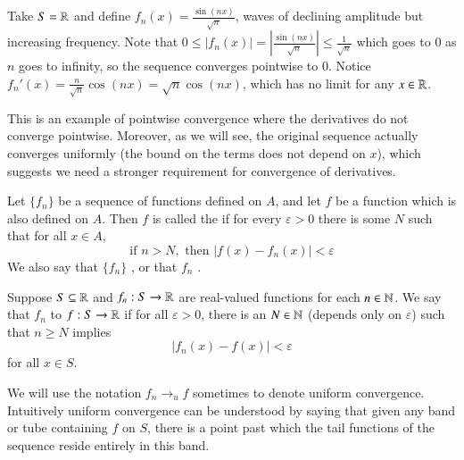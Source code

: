 \begin{example}
    Take $S = \mathbb R$ and define $f_n(x) = \frac{\sin(nx)}{\sqrt{n}}$, waves of declining amplitude but increasing frequency. Note that $0 \leq |f_n(x)| = \left|\frac{\sin(nx)}{\sqrt{n}}\right| \leq \frac{1}{\sqrt{n}}$ which goes to $0$ as $n$ goes to infinity, so the sequence converges pointwise to $0$. Notice $f_n'(x) = \frac{n}{\sqrt{n}}\cos(nx) = \sqrt{n}\cos(nx)$, which has no limit for any $x \in \mathbb R$.
\end{example}

This is an example of pointwise convergence where the derivatives do not converge pointwise. Moreover, as we will see, the original sequence actually converges uniformly (the bound on the terms does not depend on $x$), which suggests we need a stronger requirement for convergence of derivatives.


\begin{definition}
    Let $\{f_n\}$ be a sequence of functions defined on $A$, and let $f$ be a function which is also defined on $A$. Then $f$ is called the  if for every $\varepsilon > 0$ there is some $N$ such that for all $x \in A$, \begin{equation*}
        \text{if } n> N, \text{ then } |f(x) - f_n(x)| < \varepsilon
    \end{equation*}
    We also say that $\{f_n\}$ , or that $f_n$ .
\end{definition}


\begin{definition}
    Suppose $S \subseteq \mathbb R$ and $f_n:S\rightarrow \mathbb R$ are real-valued functions for each $n \in \mathbb N$. We say that $f_n$  to $f:S\rightarrow \mathbb R$ if for all $\varepsilon > 0$, there is an $N \in \mathbb N$ (depends only on $\varepsilon$) such that $n \geq N$ implies \begin{equation*}
        |f_n(x) - f(x)| < \varepsilon
    \end{equation*}
    for all $x \in S$.
\end{definition}

We will use the notation $f_n\rightarrow_uf$ sometimes to denote uniform convergence. Intuitively uniform convergence can be understood by saying that given any band or tube containing $f$ on $S$, there is a point past which the tail functions of the sequence reside entirely in this band.

